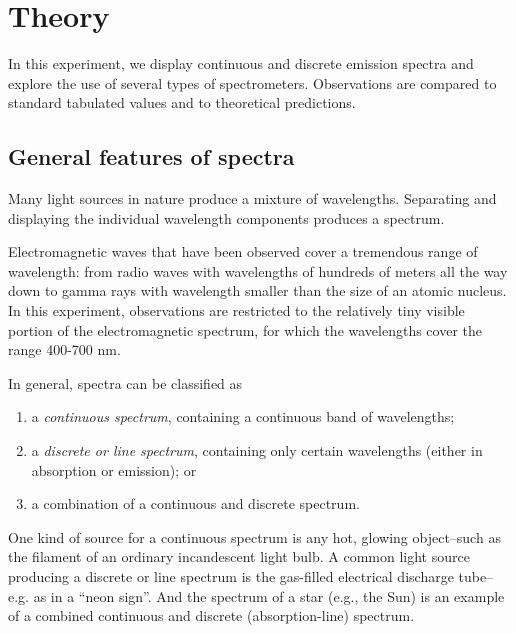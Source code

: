 \section{Theory}

In this experiment, we display continuous and discrete emission spectra
and explore the use of several types of spectrometers.  Observations
are compared to standard tabulated values and to theoretical
predictions.


\subsection{General features of spectra}

Many light sources in nature produce a mixture of wavelengths.  Separating and
displaying the individual wavelength components produces a spectrum.

Electromagnetic waves that have been observed cover a tremendous range of
wavelength: from radio waves with wavelengths of hundreds of meters all the way
down to gamma rays with wavelength smaller than the size of an atomic
nucleus. In this experiment, observations are restricted to the relatively tiny
visible portion of the electromagnetic spectrum, for which the wavelengths cover
the range 400-700 nm.

In general, spectra can be classified as

\begin{enumerate}
\item a \textit{continuous spectrum}, containing a continuous band of
wavelengths; 
\item a \textit{discrete or line spectrum}, containing only certain wavelengths
  (either in absorption or emission); or
\item a combination of a continuous and discrete spectrum. 
\end{enumerate}

One kind of source for a continuous spectrum is any hot, glowing object--such as
the filament of an ordinary incandescent light bulb. A common light source
producing a discrete or line spectrum is the gas-filled electrical discharge
tube--e.g. as in a ``neon sign''. And the spectrum of a star (e.g., the Sun) is
an example of a combined continuous and discrete (absorption-line) spectrum.

